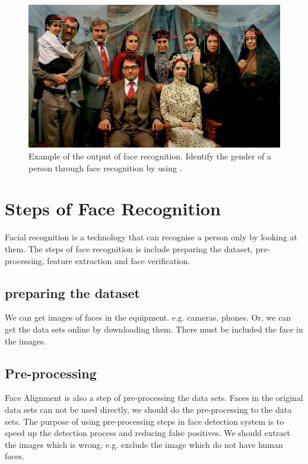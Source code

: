\documentclass[10pt,twocolumn,letterpaper]{article}
\begin{document}
\begin{figure}[htp]
  \centering
   \includegraphics[width=0.9\linewidth]{image.jpeg}

   \caption{Example of the output of face recognition. Identify the gender of a person through face recognition by using . ~\cite{github}}
\end{figure}




\section{Steps of Face Recognition}
\label{steps info}

Facial recognition is a technology that can recognise a person only by looking at them.
The steps of face recognition is include preparing the dataset, pre-processing, feature extraction and face verification. 



\subsection{preparing the dataset}
We can get images of faces in the equipment. e.g. cameras, phones.
Or, we can get the data sets online by downloading them.
There must be included the face in the images. 

\subsection{Pre-processing}
Face Alignment is also a step of pre-processing the data sets.
Faces in the original data sets can not be used directly, we should do the pre-processing to the data sets.
The purpose of using pre-processing steps in face detection system is to speed up the detection process and reducing false positives.
We should extract the images which is wrong. e.g. exclude the image which do not have human faces.
\end{document}
